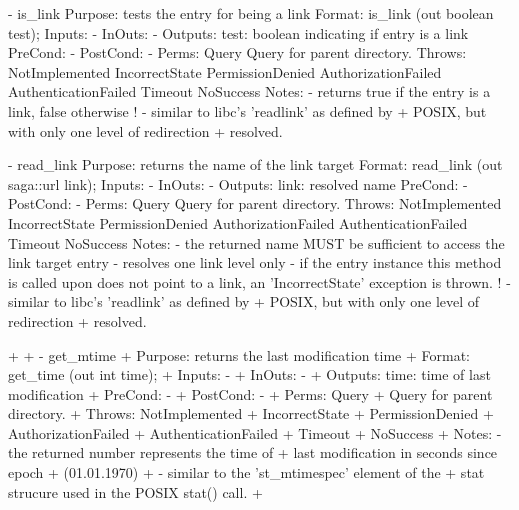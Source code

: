 \begin{myspec}
 
    - is_link
      Purpose:  tests the entry for being a link
      Format:   is_link            (out boolean test);
      Inputs:   -
      InOuts:   -
      Outputs:  test:               boolean indicating if
                                    entry is a link
      PreCond:  -
      PostCond: -
      Perms:    Query
                Query for parent directory.
      Throws:   NotImplemented
                IncorrectState
                PermissionDenied
                AuthorizationFailed
                AuthenticationFailed
                Timeout
                NoSuccess
      Notes:    - returns true if the entry is a link, false
                  otherwise
!               - similar to libc's 'readlink' as defined by
+                 POSIX, but with only one level of redirection
+                 resolved.
 
 
    - read_link 
      Purpose:  returns the name of the link target
      Format:   read_link          (out saga::url link);
      Inputs:   -
      InOuts:   -
      Outputs:  link:               resolved name
      PreCond:  -
      PostCond: -
      Perms:    Query
                Query for parent directory.
      Throws:   NotImplemented
                IncorrectState
                PermissionDenied
                AuthorizationFailed
                AuthenticationFailed
                Timeout
                NoSuccess
      Notes:    - the returned name MUST be sufficient to
                  access the link target entry
                - resolves one link level only
                - if the entry instance this method is called
                  upon does not point to a link, an
                  'IncorrectState' exception is thrown.
!               - similar to libc's 'readlink' as defined by
+                 POSIX, but with only one level of redirection
+                 resolved.
 
+
+   - get_mtime
+     Purpose:  returns the last modification time
+     Format:   get_time           (out int time);
+     Inputs:   -
+     InOuts:   -
+     Outputs:  time:               time of last modification
+     PreCond:  -
+     PostCond: -
+     Perms:    Query
+               Query for parent directory.
+     Throws:   NotImplemented
+               IncorrectState
+               PermissionDenied
+               AuthorizationFailed
+               AuthenticationFailed
+               Timeout
+               NoSuccess
+     Notes:    - the returned number represents the time of
+                 last modification in seconds since epoch
+                 (01.01.1970)
+               - similar to the 'st_mtimespec' element of the
+                 stat strucure used in the POSIX stat() call.
+
 

\end{myspec}
